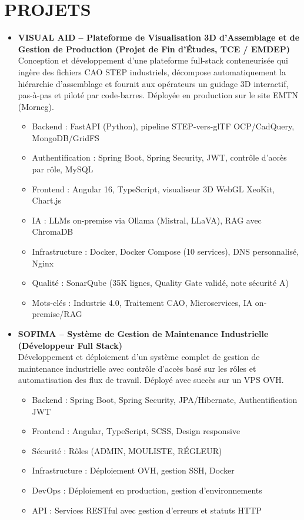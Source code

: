 \documentclass[paper=a4,fontsize=11pt]{scrartcl}
\newcommand{\NewPart}[1]{\section*{\uppercase{#1}}}
\begin{document}
\NewPart{Projets}
\begin{itemize}
    \item \textbf{VISUAL AID – Plateforme de Visualisation 3D d'Assemblage et de Gestion de Production (Projet de Fin d'Études, TCE / EMDEP)} \\
    Conception et développement d'une plateforme full-stack conteneurisée qui ingère des fichiers CAO STEP industriels, décompose automatiquement la hiérarchie d'assemblage et fournit aux opérateurs un guidage 3D interactif, pas-à-pas et piloté par code-barres. Déployée en production sur le site EMTN (Morneg).
\begin{itemize}
    \item Backend : FastAPI (Python), pipeline STEP-vers-glTF OCP/CadQuery, MongoDB/GridFS
    \item Authentification : Spring Boot, Spring Security, JWT, contrôle d'accès par rôle, MySQL
    \item Frontend : Angular 16, TypeScript, visualiseur 3D WebGL XeoKit, Chart.js
    \item IA : LLMs on-premise via Ollama (Mistral, LLaVA), RAG avec ChromaDB
    \item Infrastructure : Docker, Docker Compose (10 services), DNS personnalisé, Nginx
    \item Qualité : SonarQube (35K lignes, Quality Gate validé, note sécurité A)
    \item Mots-clés : Industrie 4.0, Traitement CAO, Microservices, IA on-premise/RAG
\end{itemize}

    \item \textbf{SOFIMA – Système de Gestion de Maintenance Industrielle (Développeur Full Stack)} \\
    Développement et déploiement d’un système complet de gestion de maintenance industrielle avec contrôle d’accès basé sur les rôles et automatisation des flux de travail. Déployé avec succès sur un VPS OVH.
\begin{itemize}
    \item Backend : Spring Boot, Spring Security, JPA/Hibernate, Authentification JWT
    \item Frontend : Angular, TypeScript, SCSS, Design responsive
    \item Sécurité : Rôles (ADMIN, MOULISTE, RÉGLEUR)
    \item Infrastructure : Déploiement OVH, gestion SSH, Docker
    \item DevOps : Déploiement en production, gestion d’environnements
    \item API : Services RESTful avec gestion d’erreurs et statuts HTTP
\end{itemize}


\end{itemize}
\end{document}
